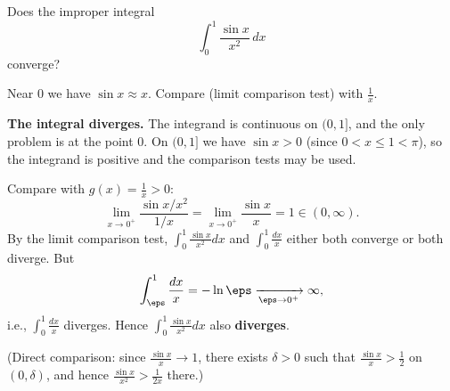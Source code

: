 
\begin{question}
Does the improper integral
\[ \int_0^1\frac{\sin x}{x^2}\,dx \]
converge?
\end{question}

\begin{hint}
Near $0$ we have $\sin x\approx x$. Compare (limit comparison test) with $\frac1x$.
\end{hint}

\begin{solution}
\textbf{The integral diverges.}
The integrand is continuous on $(0,1]$, and the only problem is at the point $0$. On $(0,1]$ we have $\sin x>0$ (since $0<x\le1<\pi$), so the integrand is positive and the comparison tests may be used.

Compare with $g(x)=\frac1x>0$:
\[ \lim_{x\to0^+}\frac{\sin x/x^2}{1/x}=\lim_{x\to0^+}\frac{\sin x}{x}=1\in(0,\infty). \]
By the limit comparison test, $\int_0^1\frac{\sin x}{x^2}dx$ and $\int_0^1\frac{dx}{x}$ either both converge or both diverge. But
\[ \int_\eps^1\frac{dx}{x}=-\ln\eps\xrightarrow[\eps\to0^+]{}\infty, \]
i.e., $\int_0^1\frac{dx}{x}$ diverges. Hence $\int_0^1\frac{\sin x}{x^2}dx$ also \textbf{diverges}.

(Direct comparison: since $\frac{\sin x}{x}\to1$, there exists $\delta>0$ such that $\frac{\sin x}{x}>\frac12$ on $(0,\delta)$, and hence $\frac{\sin x}{x^2}>\frac{1}{2x}$ there.)
\end{solution}
